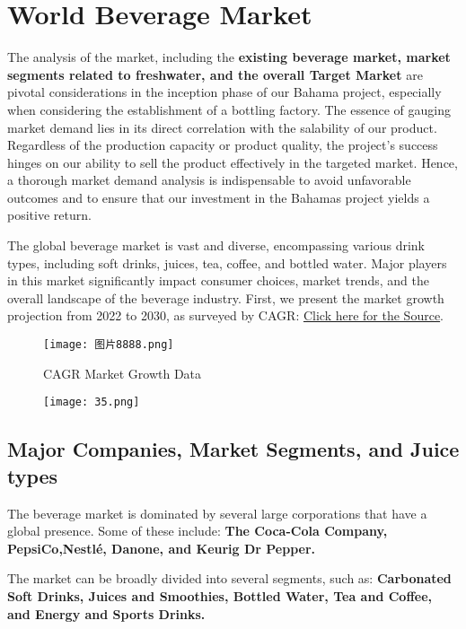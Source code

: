 \documentclass{article}
\begin{document}
\tableofcontents
\newpage

\section{World Beverage Market}
The analysis of the market, including the \textbf{existing beverage market, market segments related to freshwater, and the overall Target Market} are pivotal considerations in the inception phase of our Bahama project, especially when considering the establishment of a bottling factory. The essence of gauging market demand lies in its direct correlation with the salability of our product. Regardless of the production capacity or product quality, the project’s success hinges on our ability to sell the product effectively in the targeted market. Hence, a thorough market demand analysis is indispensable to avoid unfavorable outcomes and to ensure that our investment in the Bahamas project yields a positive return. \par

The global beverage market is vast and diverse, encompassing various drink types, including soft drinks, juices, tea, coffee, and bottled water. Major players in this market significantly impact consumer choices, market trends, and the overall landscape of the beverage industry. First, we present the market growth projection from 2022 to 2030, as surveyed by CAGR: \href{https://www.mordorintelligence.com/industry-reports/beverages-market}{Click here for the Source}.
\begin{figure}[H]
\centering
\texttt{[image: 图片8888.png]}
\label{fig:unique_label_1}
\caption{CAGR Market Growth Data}
\end{figure}
\begin{figure}[H]
\centering
\texttt{[image: 35.png]}
\label{fig:unique_label_1}
\end{figure}
\subsection{Major Companies, Market Segments, and Juice types}
The beverage market is dominated by several large corporations that have a global presence. Some of these include: \textbf{The Coca-Cola Company, PepsiCo,Nestlé, Danone, and Keurig Dr Pepper.}\par

The market can be broadly divided into several segments, such as: \textbf{Carbonated Soft Drinks, Juices and Smoothies, Bottled Water, Tea and Coffee, and Energy and Sports Drinks.}\par
\end{document}
